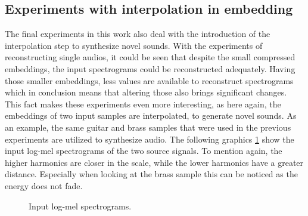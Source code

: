 \subsection{Experiments with interpolation in embedding}
The final experiments in this work also deal with the introduction of the interpolation step to synthesize novel sounds. With the experiments of reconstructing single audios, it could be seen that despite the small compressed embeddings, the input spectrograms could be reconstructed adequately. Having those smaller embeddings, less values are available to reconstruct spectrograms which in conclusion means that altering those also brings significant changes. This fact makes these experiments even more interesting, as here again, the embeddings of two input samples are interpolated, to generate novel sounds. As an example, the same guitar and brass samples that were used in the previous experiments are utilized to synthesize audio. The following graphics \ref{fig:res_mel_original_guit_brass} show the input log-mel spectrograms of the two source signals. To mention again, the higher harmonics are closer in the scale, while the lower harmonics have a greater distance. Especially when looking at the brass sample this can be noticed as the energy does not fade.

\begin{figure}[htb!]
    \centering
    \captionsetup{justification=centering}
    \caption{Input log-mel spectrograms.}
    \label{fig:res_mel_original_guit_brass}
\end{figure}

